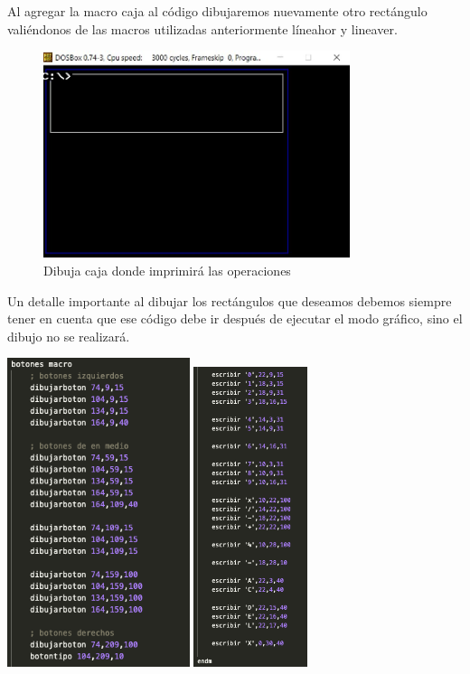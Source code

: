 \documentclass[letterpaper,12 pt,titlepage]{article}
\begin{document}
    Al agregar la macro caja al código dibujaremos nuevamente otro rectángulo valiéndonos de las macros utilizadas anteriormente líneahor y lineaver.

    \begin{figure}[H]
    \centering
    \includegraphics[width=0.8\textwidth]{img/11.png}
    \caption{Dibuja caja donde imprimirá las operaciones}
    \end{figure}

    Un detalle importante al dibujar los rectángulos que deseamos debemos siempre tener en cuenta que ese código debe ir después de ejecutar el modo gráfico, sino el dibujo no se realizará.

    \begin{center}
        \includegraphics[width=0.4\textwidth]{img/12.png}
        \includegraphics[width=0.25\textwidth]{img/13.png}
    \end{center}
\end{document}
